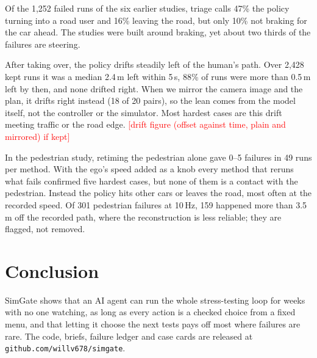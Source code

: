 \documentclass[conference]{IEEEtran}
\newcommand{\guide}[1]{}
\newcommand{\verify}[1]{\textcolor{red}{[#1]}}
\begin{document}
Of the 1,252 failed runs of the six earlier studies, triage calls 47\% the policy turning into a road user and 16\% leaving the road, but only 10\% not braking for the car ahead. The studies were built around braking, yet about two thirds of the failures are steering.

After taking over, the policy drifts steadily left of the human's path. Over 2,428 kept runs it was a median 2.4\,m left within 5\,s, 88\% of runs were more than 0.5\,m left by then, and none drifted right. When we mirror the camera image and the plan, it drifts right instead (18 of 20 pairs), so the lean comes from the model itself, not the controller or the simulator. Most hardest cases are this drift meeting traffic or the road edge. \verify{drift figure (offset against time, plain and mirrored) if kept}

In the pedestrian study, retiming the pedestrian alone gave 0--5 failures in 49 runs per method. With the ego's speed added as a knob every method that reruns what fails confirmed five hardest cases, but none of them is a contact with the pedestrian. Instead the policy hits other cars or leaves the road, most often at the recorded speed. Of 301 pedestrian failures at 10\,Hz, 159 happened more than 3.5\,m off the recorded path, where the reconstruction is less reliable; they are flagged, not removed.


\section{Conclusion}\label{sec:conclusion}
\guide{\textbf{Paragraph 1: summary.} Restate the two main claims in a few sentences: an agent can run stress testing of a driving policy end to end, unattended, when each action is a checked choice from a fixed menu; and letting it choose the next tests pays off most where failures are rare. Say where the code and data are released.}

SimGate shows that an AI agent can run the whole stress-testing loop for weeks with no one watching, as long as every action is a checked choice from a fixed menu, and that letting it choose the next tests pays off most where failures are rare. The code, briefs, failure ledger and case cards are released at \texttt{github.com/willv678/simgate}.


\guide{\textbf{Paragraph 2: limitations and future work.} Pair each limitation with the direction that addresses it: one policy under test (test more end-to-end policies); replayed traffic does not react (use reactive traffic); few scenes for some maneuvers (add more scenario types); few repeats per method (run more repeats, and try other models as the agent). Also state the limitations with no direction yet: rendering is less certain far from the recording, and the human check of the scoring is still pending. End with the confirmed hardest cases reused as regression tests.}
\end{document}
